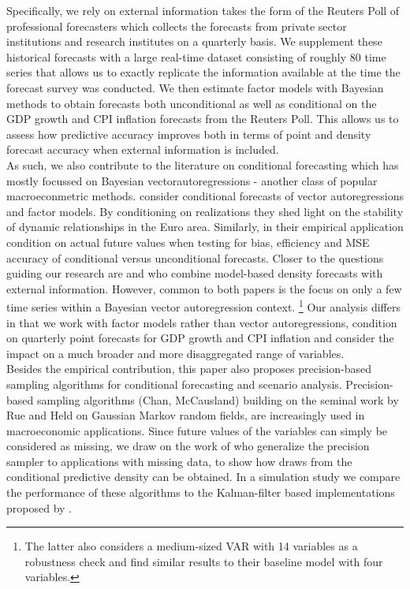 \documentclass[notitlepage,a4paper,12pt]{article}
\begin{document}
Specifically, we rely on external information takes the form of the Reuters Poll of professional forecasters which collects the forecasts from private sector institutions and research institutes on a quarterly basis. We supplement these historical forecasts with a large real-time dataset consisting of roughly 80 time series that allows us to exactly replicate the information available at the time the forecast survey was conducted. We then estimate factor models with Bayesian methods to obtain forecasts both unconditional as well as conditional on the GDP growth and CPI inflation forecasts from the Reuters Poll. This allows us to assess how predictive accuracy improves both in terms of point and density forecast accuracy when external information is included.\\

As such, we also contribute to the literature on conditional forecasting which has mostly focussed on Bayesian vectorautoregressions - another class of popular macroeconmetric methods. \citet{bgl_2015ijf} consider conditional forecasts of vector autoregressions and factor models. By conditioning on realizations they shed light on the stability of dynamic relationships in the Euro area. Similarly, in their empirical application \citet{clarkmccracken_2017_jae} condition on actual future values when testing for bias, efficiency and MSE accuracy of conditional versus unconditional forecasts. Closer to the questions guiding our research are \citet{kruegerclarkravazzolo2017_jbes} and \citet{ganicsodendahl_2021_ijf} who combine model-based density forecasts with external information. However, common to both papers is the focus on only a few time series within a Bayesian vector autoregression context. \footnote{The latter also considers a medium-sized VAR with 14 variables as a robustness check and find similar results to their baseline model with four variables.} Our analysis differs in that we work with factor models rather than vector autoregressions, condition on quarterly point forecasts for GDP growth and CPI inflation and consider the impact on a much broader and more disaggregated range of variables.\\

Besides the empirical contribution, this paper also proposes precision-based sampling algorithms for conditional forecasting and scenario analysis. Precision-based sampling algorithms (Chan, McCausland) building on the seminal work by Rue and Held on Gaussian Markov random fields, are increasingly used in macroeconomic applications. Since future values of the variables can simply be considered as missing, we draw on the work of \citet{HauberSchumacher2021} who generalize the precision sampler to applications with missing data, to show how draws from the conditional predictive density can be obtained. In a simulation study we compare the performance of these algorithms to the Kalman-filter based implementations proposed by \citet{bgl_2015ijf}.\\
\end{document}
